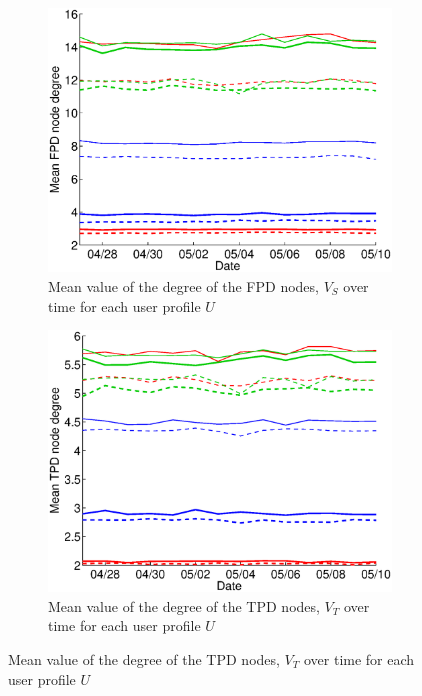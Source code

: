 \documentclass{sig-alternate}
\begin{document}
  \begin{figure}
   \centering
   
   \begin{subfigure}{.45\textwidth}
    \includegraphics[width=\textwidth]{figures/plots/first-means.eps}
    \caption{Mean value of the degree of the FPD nodes, $V_S$ over time for each user profile $U$}
    \label{fig:first_means}
  \end{subfigure}
  
  \begin{subfigure}{.45\textwidth}
    \includegraphics[width=\textwidth]{figures/plots/third-means.eps}
    \caption{Mean value of the degree of the TPD nodes, $V_T$ over time for each user profile $U$}
    \label{fig:third_means}
  \end{subfigure}


\end{figure}
\end{document}
